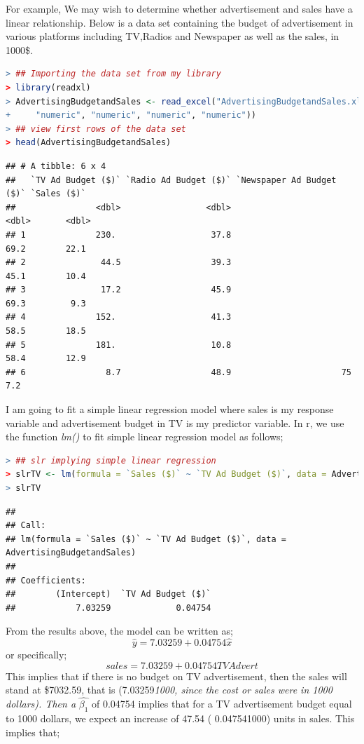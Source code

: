 \documentclass[
]{article}
\begin{document}
For example, We may wish to determine whether advertisement and sales
have a linear relationship. Below is a data set containing the budget of
advertisement in various platforms including TV,Radios and Newspaper as
well as the sales, in 1000\$.

\begin{lstlisting}[language=R]
> ## Importing the data set from my library
> library(readxl)
> AdvertisingBudgetandSales <- read_excel("AdvertisingBudgetandSales.xlsx", col_types = c("skip",
+     "numeric", "numeric", "numeric", "numeric"))
> ## view first rows of the data set
> head(AdvertisingBudgetandSales)
\end{lstlisting}

\begin{lstlisting}
## # A tibble: 6 x 4
##   `TV Ad Budget ($)` `Radio Ad Budget ($)` `Newspaper Ad Budget ($)` `Sales ($)`
##                <dbl>                 <dbl>                     <dbl>       <dbl>
## 1              230.                   37.8                      69.2        22.1
## 2               44.5                  39.3                      45.1        10.4
## 3               17.2                  45.9                      69.3         9.3
## 4              152.                   41.3                      58.5        18.5
## 5              181.                   10.8                      58.4        12.9
## 6                8.7                  48.9                      75           7.2
\end{lstlisting}

I am going to fit a simple linear regression model where sales is my
response variable and advertisement budget in TV is my predictor
variable. In r, we use the function \emph{lm()} to fit simple linear
regression model as follows;

\begin{lstlisting}[language=R]
> ## slr implying simple linear regression
> slrTV <- lm(formula = `Sales ($)` ~ `TV Ad Budget ($)`, data = AdvertisingBudgetandSales)
> slrTV
\end{lstlisting}

\begin{lstlisting}
## 
## Call:
## lm(formula = `Sales ($)` ~ `TV Ad Budget ($)`, data = AdvertisingBudgetandSales)
## 
## Coefficients:
##        (Intercept)  `TV Ad Budget ($)`  
##            7.03259             0.04754
\end{lstlisting}

From the results above, the model can be written as;
\[\hat{y}=7.03259+0.04754\hat{x}\] or specifically;
\[sales=7.03259+0.04754TVAdvert\] This implies that if there is no
budget on TV advertisement, then the sales will stand at \$7032.59, that
is (7.03259\emph{1000, since the cost or sales were in 1000 dollars).
Then a} \(\hat{\beta_1}\) of 0.04754 implies that for a TV advertisement
budget equal to 1000 dollars, we expect an increase of 47.54 (
0.047541000) units in sales. This implies that;
\end{document}
